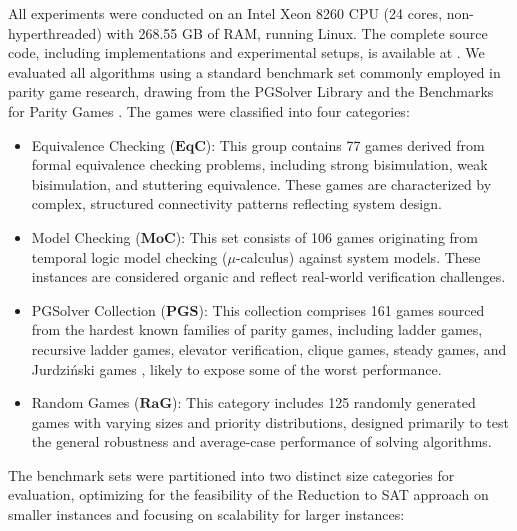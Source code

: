\documentclass[runningheads]{llncs}
\begin{document}
All experiments were conducted on an Intel Xeon 8260 CPU (24 cores, non-hyperthreaded) with 268.55 GB of RAM, running Linux. The complete source code, including implementations and experimental setups, is available at \cite{Hernandez:Github:NoOppnentCycle:2025}.
%
We evaluated all algorithms using a standard benchmark set commonly employed in parity game research, drawing from the PGSolver Library \cite{Friedmann:2017} and the Benchmarks for Parity Games \cite{Keiren:2015}. The games were classified into four categories:

\begin{itemize}
    \item Equivalence Checking ($\textbf{EqC}$): This group contains 77 games derived from formal equivalence checking problems, including strong bisimulation, weak bisimulation, and stuttering equivalence. These games are characterized by complex, structured connectivity patterns reflecting system design.
    \item Model Checking ($\textbf{MoC}$): This set consists of 106 games originating from temporal logic model checking ($\mu$-calculus) against system models. These instances are considered organic and reflect real-world verification challenges.
    \item PGSolver Collection ($\textbf{PGS}$): This collection comprises 161 games sourced from the hardest known families of parity games, including ladder games, recursive ladder games, elevator verification, clique games, steady games, and Jurdziński games \cite{Benerecetti:2016}, likely to expose some of the worst performance.
    \item Random Games ($\textbf{RaG}$): This category includes 125 randomly generated games with varying sizes and priority distributions, designed primarily to test the general robustness and average-case performance of solving algorithms.
\end{itemize}

The benchmark sets were partitioned into two distinct size categories for evaluation, optimizing for the feasibility of the Reduction to SAT approach on smaller instances and focusing on scalability for larger instances:
\end{document}
